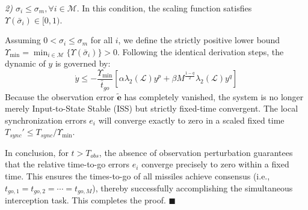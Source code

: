 \documentclass[lettersize,journal]{IEEEtran}
\begin{document}
\textit{2) ${\sigma}_i \leq {\sigma}_m, \forall i \in \mathcal{M}$}. In this condition, the scaling function satisfies $\Upsilon(\bar{\sigma}_i) \in [0, 1)$. 

Assuming $0 < \sigma_i \le \sigma_m$ for all $i$, we define the strictly positive lower bound $\Upsilon_{\min} = \min_{i \in \mathcal{M}} \{ \Upsilon(\bar{\sigma}_i) \} > 0$. Following the identical derivation steps, the dynamic of $y$ is governed by:
\begin{equation}
	\dot{y} \leq -\frac{\Upsilon_{\min}}{\bar{t}_{go}} \left[ \alpha \lambda_2(\mathcal{L}) y^p + \beta M^{\frac{1-q}{2}} \lambda_2(\mathcal{L}) y^q \right]
\end{equation}
Because the observation error $\tilde{\mathbf{e}}$ has completely vanished, the system is no longer merely Input-to-State Stable (ISS) but strictly fixed-time convergent. The local synchronization errors $e_i$ will converge exactly to zero in a scaled fixed time $T_{sync}' \le T_{sync} / \Upsilon_{\min}$.

In conclusion, for $t > T_{obs}$, the absence of observation perturbation guarantees that the relative time-to-go errors $e_i$ converge precisely to zero within a fixed time. This ensures the times-to-go of all missiles achieve consensus (i.e., $t_{go,1} = t_{go,2} = \cdots = t_{go,M}$), thereby successfully accomplishing the simultaneous interception task. This completes the proof. \hfill $\blacksquare$
\end{document}
